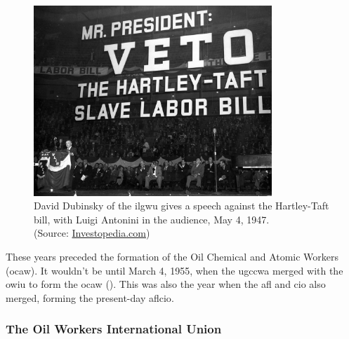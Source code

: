 \documentclass[12pt]{article}
\newcommand{\imageWidth}{0.8\textwidth}
\begin{document}
\begin{figure}[ht]
  \centering
  \includegraphics[width=\imageWidth]{images/slave_labor_bill}
  \captionsetup{justification=centering, singlelinecheck=false, margin=2cm} 
  \caption[Anti-Hartley-Taft Rally]{David Dubinsky of the \acrfull{ilgwu} gives a speech against the Hartley-Taft bill, with Luigi Antonini in the audience, May 4, 1947.\\ (Source: \href{https://www.investopedia.com/thmb/VcswppMRTl8IqMbgLRqdigfIGvs=/1500x0/filters:no_upscale():max_bytes(150000):strip_icc()/5278798677_0429e6aa05_k-7b6b81bdbbe44cdb929c08c7da9f8d29.jpg}{Investopedia.com}) \nocite{investopediaMrPresidentVeto}}
  \label{fig:slave_labor_bill}
\end{figure}

These years preceded the formation of the Oil Chemical and Atomic Workers (\acrshort{ocaw}). It wouldn’t be until March 4, 1955, when the \acrfull{ugccwa} merged with the \acrfull{owiu} to form the \acrshort{ocaw} (\cite[48]{ocawFactBookOil1960}). This was also the year when the \acrshort{afl} and \acrshort{cio} also merged, forming the present-day \acrfull{aflcio}.

\subsubsection{The Oil Workers International Union}
\end{document}
